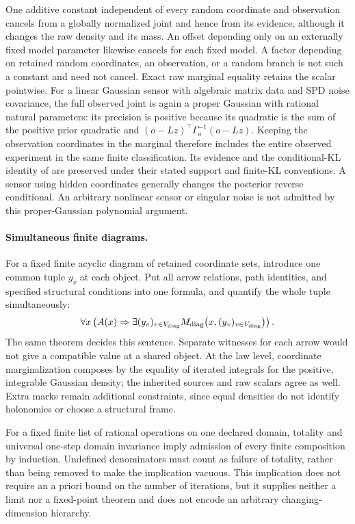 One additive constant independent of every random coordinate and
observation cancels from a globally normalized joint and hence
from its evidence, although it changes the raw density and its
mass. An offset depending only on an externally fixed model
parameter likewise cancels for each fixed model. A factor
depending on retained random coordinates, an observation, or
a random branch is not such a constant and need not cancel.
Exact raw marginal equality retains the scalar pointwise.
For a linear Gaussian sensor with algebraic matrix data and SPD
noise covariance, the full observed joint is again a proper
Gaussian with rational natural parameters: its precision is
positive because its quadratic is the sum of the positive prior
quadratic and
\((o-Lz)^\top\Gamma_o^{-1}(o-Lz)\).
Keeping the observation coordinates in the marginal therefore
includes the entire observed experiment in the same finite
classification. Its evidence and the conditional-KL identity
of  are preserved under their stated
support and finite-KL conventions. A sensor using hidden
coordinates generally changes the posterior reverse conditional.
An arbitrary nonlinear sensor or singular noise is not admitted
by this proper-Gaussian polynomial argument.

\paragraph{Simultaneous finite diagrams.}
For a fixed finite acyclic diagram of retained coordinate sets,
introduce one common tuple \(y_v\) at each object. Put all arrow
relations, path identities, and specified structural conditions
into one formula, and quantify the whole tuple simultaneously:
\begin{equation}
\forall x\left(A(x)\Rightarrow
\exists (y_v)_{v\in V_{\rm diag}}
M_{\rm diag}\bigl(x,(y_v)_{v\in V_{\rm diag}}\bigr)\right).
\label{eq:cg-semialgebraic-diagram}
\end{equation}
The same theorem decides this sentence. Separate witnesses for
each arrow would not give a compatible value at a shared object.
At the law level, coordinate marginalization composes by the
equality of iterated integrals for the positive, integrable
Gaussian density; the inherited sources and raw scalars agree
as well. Extra marks remain additional constraints, since equal
densities do not identify holonomies or choose a structural frame.

For a fixed finite list of rational operations on one declared
domain, totality and universal one-step domain invariance imply
admission of every finite composition by induction. Undefined
denominators must count as failure of totality, rather than being
removed to make the implication vacuous. This implication does
not require an a priori bound on the number of iterations, but
it supplies neither a limit nor a fixed-point theorem and does
not encode an arbitrary changing-dimension hierarchy.

